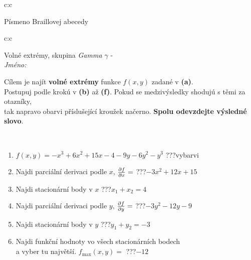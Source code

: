 \documentclass[10pt]{report}
\begin{document}
\begin{tabular}{c:c}
\begin{minipage}[c][104.5mm][t]{0.5\linewidth}
\begin{center}
\begin{minipage}{0.20\linewidth}
\begin{center}
{\small Písmeno Braillovej abecedy}
\end{center}
\end{minipage}
\end{center}
\end{minipage}
%
\end{tabular}
\newpage
\thispagestyle{empty}
\begin{tabular}{c:c}
\begin{minipage}[c][104.5mm][t]{0.5\linewidth}
\begin{center}
\vspace{7mm}
{\huge Volné extrémy, skupina \textit{Gamma $\gamma$} -}\\[5mm]
\textit{Jméno:}\phantom{xxxxxxxxxxxxxxxxxxxxxxxxxxxxxxxxxxxxxxxxxxxxxxxxxxxxxxxxxxxxxxxxx}\\[5mm]
\begin{minipage}{0.95\linewidth}
\begin{center}
Cílem je najít \textbf{volné extrémy} funkce $f(x,y)$ zadané v \textbf{(a)}.\\Postupuj podle krokú v \textbf{(b)} až \textbf{(f)}. Pokud se medzivýsledky shodujú s těmi za otazníky,\\tak napravo obarvi příslušející kroužek načerno. \textbf{Spolu odevzdejte výsledné slovo}.
\end{center}
\end{minipage}
\\[1mm]
\begin{minipage}{0.79\linewidth}
\begin{center}
\begin{varwidth}{\linewidth}
\begin{enumerate}
\normalsize
\item $f(x,y)=-x^3+6x^2+15x-4-9y-6y^2-y^3$\quad \dotfill\; ???\;\dotfill \quad vybarvi
\item Najdi parciální derivaci podle $x$, $\pdv{f}{x}=$\quad \dotfill\; ???\;\dotfill \quad $-3x^2+12x+15$
\item Najdi stacionární body v $x$\quad \dotfill\; ???\;\dotfill \quad $x_1+x_2=4$
\item Najdi parciální derivaci podle $y$, $\pdv{f}{y}=$\quad \dotfill\; ???\;\dotfill \quad $-3y^2-12y-9$
\item Najdi stacionární body v $y$\quad \dotfill\; ???\;\dotfill \quad $y_1+y_2=-3$
\item Najdi funkční hodnoty vo všech stacionárních bodech \\ \phantom{xxxxxx} a vyber tu najvětší. $f_{\text{max}}(x,y)=$\quad \dotfill\; ???\;\dotfill \quad $-12$

\end{enumerate}
\end{varwidth}
\end{center}
\end{minipage}
\end{center}
\end{minipage}
\end{tabular}
\end{document}
